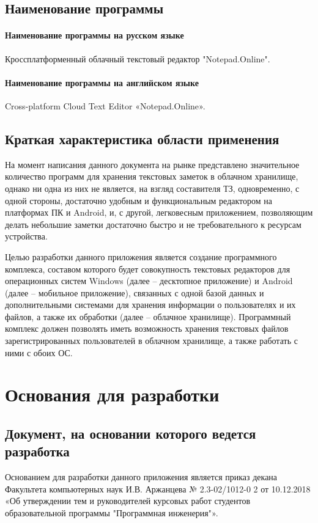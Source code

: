 ﻿\documentclass[techtask]{espd}
\begin{document}
\subsection{Наименование программы}
\paragraph{Наименование программы на русском языке}
Кроссплатформенный облачный текстовый редактор "Notepad.Online".

\paragraph{Наименование программы на английском языке}
Cross-platform Cloud Text Editor «Notepad.Online».

\subsection{Краткая характеристика области применения}
На момент написания данного документа на рынке представлено значительное количество программ для хранения текстовых заметок в облачном хранилище, однако ни одна из них не является, на взгляд составителя ТЗ, одновременно, с одной стороны, достаточно удобным и функциональным редактором на платформах ПК и Android, и, с другой, легковесным приложением, позволяющим делать небольшие заметки достаточно быстро и не требовательного к ресурсам устройства.

Целью разработки данного приложения является создание программного комплекса, составом которого будет совокупность текстовых редакторов для операционных систем Windows (далее – десктопное приложение) и Android (далее – мобильное приложение), связанных с одной базой данных и дополнительными системами для хранения информации о пользователях и их файлов, а также их обработки (далее – облачное хранилище). Программный комплекс должен позволять иметь возможность хранения текстовых файлов зарегистрированных пользователей в облачном хранилище, а также работать с ними с обоих ОС.

\section{Основания для разработки}

\subsection{Документ, на основании которого ведется разработка}
Основанием для разработки данного приложения является приказ декана Факультета компьютерных наук И.В. Аржанцева № 2.3-02/1012-0 2 от 10.12.2018 «Об утверждении тем и руководителей курсовых работ студентов образовательной программы "Программная инженерия"».
\end{document}
